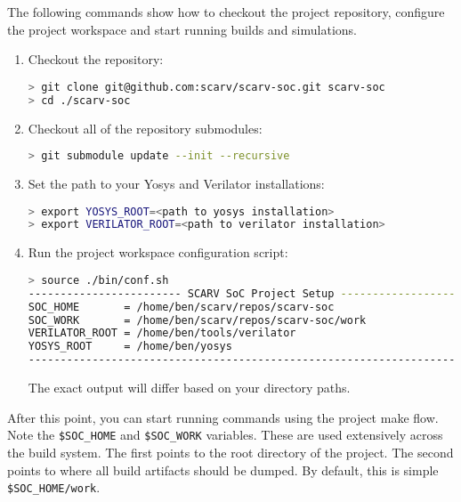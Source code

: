 
The following commands show how to checkout the \SCARVSOC project
repository, configure the project workspace and start running
builds and simulations.

\begin{enumerate}

\item Checkout the repository:

\begin{lstlisting}[language=bash,style=block]
> git clone git@github.com:scarv/scarv-soc.git scarv-soc
> cd ./scarv-soc
\end{lstlisting}

\item Checkout all of the repository submodules:

\begin{lstlisting}[language=bash,style=block]
> git submodule update --init --recursive
\end{lstlisting}

\item Set the path to your Yosys and Verilator installations:

\begin{lstlisting}[language=bash,style=block]
> export YOSYS_ROOT=<path to yosys installation>
> export VERILATOR_ROOT=<path to verilator installation>
\end{lstlisting}

\item Run the project workspace configuration script:

\begin{lstlisting}[language=bash,style=block]
> source ./bin/conf.sh
------------------------ SCARV SoC Project Setup ----------------------
SOC_HOME       = /home/ben/scarv/repos/scarv-soc
SOC_WORK       = /home/ben/scarv/repos/scarv-soc/work
VERILATOR_ROOT = /home/ben/tools/verilator
YOSYS_ROOT     = /home/ben/yosys
-----------------------------------------------------------------------
\end{lstlisting}

The exact output will differ based on your directory paths.

\end{enumerate}

After this point, you can start running commands using the project
make flow.
Note the {\tt \$SOC\_HOME} and {\tt \$SOC\_WORK} variables.
These are used extensively across the build system.
The first points to the root directory of the project.
The second points to where all build artifacts should be dumped.
By default, this is simple {\tt \$SOC\_HOME/work}.

